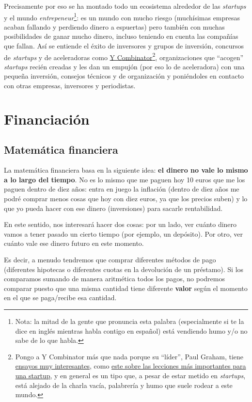 \documentclass[nochap,palatino,shortheader]{apuntes}
\begin{document}
Precisamente por eso se ha montado todo un ecosistema alrededor de las \textit{startups} y el mundo \textit{entrepeneur}\footnote{Nota: la mitad de la gente que pronuncia esta palabra (especialmente si te la dice en inglés mientras habla contigo en español) está vendiendo humo y/o no sabe de lo que habla.}:
es un mundo con mucho riesgo (muchísimas empresas acaban fallando y perdiendo dinero a espuertas) pero también con muchas posibilidades de ganar mucho dinero, incluso teniendo en cuenta las compañías que fallan.
Así se entiende el éxito de inversores y grupos de inversión, concursos de \textit{startups} y de aceleradoras como \href{https://www.ycombinator.com/}{Y Combinator}\footnote{Pongo a Y Combinator más que nada porque su ``líder'', Paul Graham, tiene \href{http://paulgraham.com/articles.html}{ensayos muy interesantes}, como \href{http://paulgraham.com/startuplessons.html}{este sobre las lecciones más importantes para una startup}, y en general es un tipo que, a pesar de estar metido en \textit{startups}, está alejado de la charla vacía, palabrería y humo que suele rodear a este mundo.},
organizaciones que ``acogen'' \textit{startups} recién creadas y les dan un empujón (por eso lo de aceleradora) con una pequeña inversión, consejos técnicos y de organización y poniéndoles en contacto con otras empresas, inversores y periodistas.

\section{Financiación}

\subsection{Matemática financiera}

La matemática financiera basa en la siguiente idea: \textbf{el dinero no vale lo mismo a lo largo del tiempo}. No es lo mismo que me paguen hoy 10 euros que me los paguen dentro de diez años: entra en juego la inflación (dentro de diez años me podré comprar menos cosas que hoy con diez euros, ya que los precios suben) y lo que yo pueda hacer con ese dinero (inversiones) para sacarle rentabilidad.

En este sentido, nos interesará hacer dos cosas: por un lado, ver cuánto dinero vamos a tener pasado un cierto tiempo (por ejemplo, un depósito). Por otro, ver cuánto vale ese dinero futuro en este momento.

Es decir, a menudo tendremos que comprar diferentes métodos de pago (diferentes hipotecas o diferentes cuotas en la devolución de un préstamo). Si los comparamos sumando de manera aritmética todos los pagos, no podremos comparar puesto que una misma cantidad tiene diferente \textbf{valor} según el momento en el que se paga/recibe esa cantidad.
\end{document}
